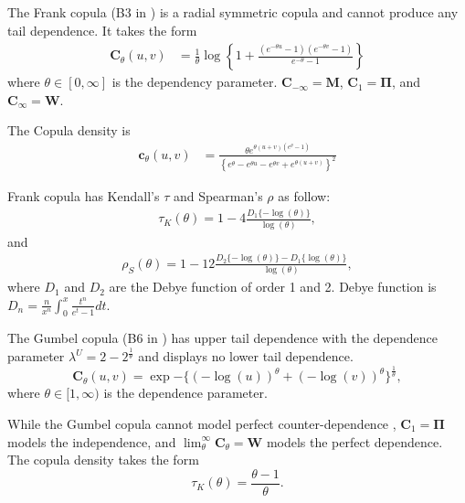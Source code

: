
The Frank copula (B3 in \citet{joe1997multivariate}) is a radial symmetric copula and cannot produce any tail dependence.
It takes the form
\begin{align}
    \bm{C}_{\theta}(u,v) &= \frac{1}{\theta}
    \log \left\{
    1 + \frac{(e^{-\theta u}-1)(e^{-\theta v}-1)}{e^{-\theta}-1}
    \right\}
    \end{align}
where $\theta \in [0, \infty]$ is the dependency parameter.
$\bm{C}_{-\infty} = \bm{M}$, $\bm{C}_1 = \bm{\Pi}$, and $\bm{C}_\infty = \bm{W}$.

The Copula density is
\begin{align}
    \bm{c}_{\theta}(u,v) &= \frac{\theta e^{\theta(u+v)(e^\theta-1)}}
    {\left\{e^\theta-e^{\theta u}-e^{\theta v}+e^{\theta (u+v)}\right\}^2}
    \end{align}\medskip

Frank copula has Kendall's $\tau$ and Spearman's $\rho$ as follow:
\begin{align}
    \tau_K(\theta) = 1-4\frac{D_1\{-\log(\theta)\}}{\log(\theta)},
    \end{align}
and
\begin{align}
    \rho_S(\theta) = 1-12\frac{D_2\{-\log(\theta)\} - D_1\{\log(\theta)\}}{\log(\theta)},
    \end{align}
where $D_1$ and $D_2$ are the Debye function of order 1 and 2.
Debye function is $D_n = \frac{n}{x^n}\int_0^x\frac{t^n}{e^t-1}dt$.\medskip

The Gumbel copula (B6 in \citet{joe1997multivariate}) has upper tail
dependence with the dependence parameter $\lambda^U =
2-2^{\frac{1}{\theta}}$ and displays no lower tail dependence. 
\begin{equation*}
  \bm{C}_{\theta}(u,v) = \exp{-\{ (-\log(u))^\theta +(-\log(v))^\theta 
    \}^{\frac{1}{\theta}}},
\end{equation*}
where $\theta \in [1,\infty)$ is the dependence parameter.
    
While the Gumbel copula cannot model perfect counter-dependence
\citep{Nelsen2002}, $\bm{C}_{1} = \bm{\Pi}$ models the independence, 
and $\lim_\theta^\infty \bm{C}_\theta = \bm{W}$ models the perfect
dependence. The copula density takes the form
  \begin{equation*}
    \tau_K(\theta) =\frac{\theta-1}{\theta}. 
   \end{equation*}

